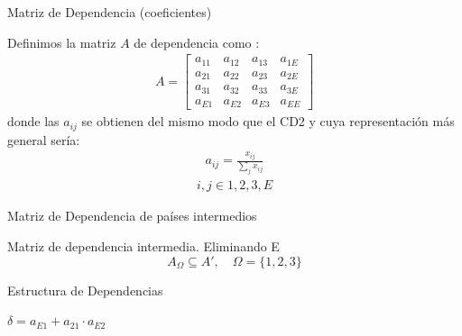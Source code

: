\documentclass{beamer}
\begin{document}
\begin{frame}{Matriz de Dependencia (coeficientes)}

    Definimos la matriz $A$ de dependencia como :
    \begin{align*}
    A=
    \begin{bmatrix}
    a_{11} & a_{12} & a_{13} & a_{1E} \\
    a_{21} & a_{22} & a_{23} & a_{2E} \\
    a_{31} & a_{32} & a_{33} & a_{3E} \\
    a_{E1} & a_{E2} & a_{E3} & a_{EE}
    \end{bmatrix}
    \end{align*}
    donde las $a_{ij}$ se obtienen del mismo modo que el CD2 y cuya representación más general sería:
    \begin{align*}
        a_{ij} = \frac{x_{ij}}{\sum_{j} x_{ij}}
    \end{align*}
    \begin{align*}
        i,j\in{1,2,3,E}
    \end{align*}
\end{frame}

\begin{frame}{Matriz de Dependencia de países intermedios}
    \begin{block}{Matriz de dependencia intermedia. Eliminando E}
        \[ A_{\Omega} \subseteq A', \quad \Omega = \{1, 2, 3\} \]
    \end{block}
\end{frame}

\begin{frame}{Estructura de Dependencias}
    \centering
    
    \vspace{0.5cm} %
    \small %
    $\delta = a_{E1} + a_{21} \cdot a_{E2}$
\end{frame}
\end{document}
